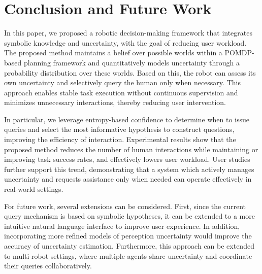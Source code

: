 \newpage
\section{Conclusion and Future Work}
In this paper, we proposed a robotic decision-making framework that integrates symbolic knowledge and uncertainty, with the goal of reducing user workload. The proposed method maintains a belief over possible worlds within a POMDP-based planning framework and quantitatively models uncertainty through a probability distribution over these worlds. Based on this, the robot can assess its own uncertainty and selectively query the human only when necessary. This approach enables stable task execution without continuous supervision and minimizes unnecessary interactions, thereby reducing user intervention.

In particular, we leverage entropy-based confidence to determine when to issue queries and select the most informative hypothesis to construct questions, improving the efficiency of interaction. Experimental results show that the proposed method reduces the number of human interactions while maintaining or improving task success rates, and effectively lowers user workload. User studies further support this trend, demonstrating that a system which actively manages uncertainty and requests assistance only when needed can operate effectively in real-world settings.

For future work, several extensions can be considered. First, since the current query mechanism is based on symbolic hypotheses, it can be extended to a more intuitive natural language interface to improve user experience. In addition, incorporating more refined models of perception uncertainty would improve the accuracy of uncertainty estimation. Furthermore, this approach can be extended to multi-robot settings, where multiple agents share uncertainty and coordinate their queries collaboratively.

